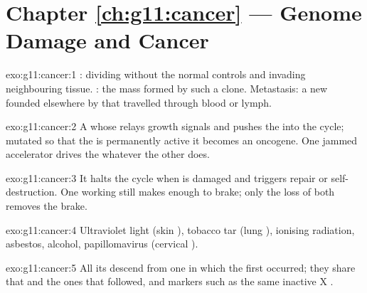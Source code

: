 \section*{Chapter \ref{ch:g11:cancer} --- Genome Damage and Cancer}

\begin{solution}{exo:g11:cancer:1}
:  dividing without the normal controls and invading
neighbouring tissue. : the mass formed by such a clone.
Metastasis: a new  founded elsewhere by  that travelled
through blood or lymph.
\end{solution}

\begin{solution}{exo:g11:cancer:2}
A  whose  relays growth signals and pushes the  into
the cycle; mutated so that the  is permanently active it
becomes an oncogene. One jammed accelerator drives the  whatever
the other  does.
\end{solution}

\begin{solution}{exo:g11:cancer:3}
It halts the cycle when  is damaged and triggers repair or
self-destruction. One working  still makes enough  to
brake; only the loss of both removes the brake.
\end{solution}

\begin{solution}{exo:g11:cancer:4}
Ultraviolet light (skin ), tobacco tar (lung ), ionising
radiation, asbestos, alcohol, papillomavirus (cervical ).
\end{solution}

\begin{solution}{exo:g11:cancer:5}
All its  descend from one  in which the first 
occurred; they share that  and the ones that followed, and
markers such as the same inactive X .
\end{solution}


